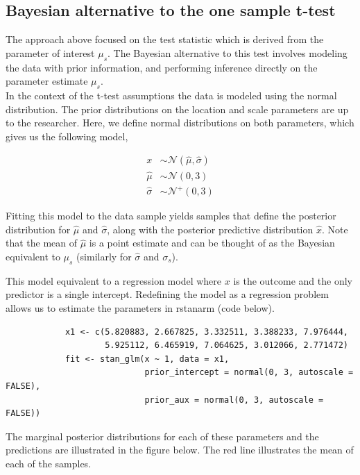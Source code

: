 \documentclass[12pt]{article}
\begin{document}
\subsection{Bayesian alternative to the one sample t-test}

The approach above focused on the test statistic which is derived from the parameter of interest $\mu_s$. The Bayesian alternative to this test involves modeling the data with prior information, and performing inference directly on the parameter estimate $\mu_s$. \\

\noindent In the context of the t-test assumptions the data is modeled using the normal distribution. The prior distributions on the location and scale parameters are up to the researcher. Here, we define normal distributions on both parameters, which gives us the following model,

\begin{align*}
x &\sim \mathcal{N}(\hat{\mu}, \hat{\sigma}) \\
\hat{\mu} &\sim \mathcal{N}(0,3) \\
\hat{\sigma} &\sim \mathcal{N}^{+}(0,3)
\end{align*}

\noindent Fitting this model to the data sample yields samples that define the posterior distribution for $\hat{\mu}$ and $\hat{\sigma}$, along with the posterior predictive distribution $\hat{x}$. Note that the mean of $\hat{\mu}$ is a point estimate and can be thought of as the Bayesian equivalent to $\mu_s$ (similarly for $\hat{\sigma}$ and $\sigma_s$).

\noindent This model equivalent to a regression model where $x$ is the outcome and the only predictor is a single intercept. Redefining the model as a regression problem allows us to estimate the parameters in rstanarm (code below). \\

\begin{verbatim}
            x1 <- c(5.820883, 2.667825, 3.332511, 3.388233, 7.976444,
                    5.925112, 6.465919, 7.064625, 3.012066, 2.771472)
            fit <- stan_glm(x ~ 1, data = x1,
                            prior_intercept = normal(0, 3, autoscale = FALSE),
                            prior_aux = normal(0, 3, autoscale = FALSE))
\end{verbatim}

 The marginal posterior distributions for each of these parameters and the predictions are illustrated in the figure below. The red line illustrates the mean of each of the samples. \\
\end{document}
